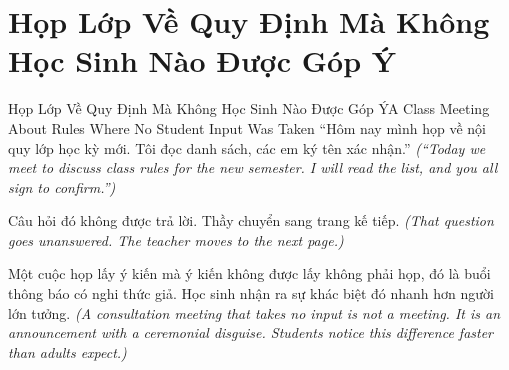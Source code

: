 \section{Họp Lớp Về Quy Định Mà Không Học Sinh Nào Được Góp Ý}
\begin{truyen}{Họp Lớp Về Quy Định Mà Không Học Sinh Nào Được Góp Ý}{A Class Meeting About Rules Where No Student Input Was Taken}
 ``Hôm nay mình họp về nội quy lớp học kỳ mới. Tôi đọc danh sách, các em ký tên xác nhận.''
\textit{(``Today we meet to discuss class rules for the new semester. I will read the list, and you all sign to confirm.'')}




Câu hỏi đó không được trả lời. Thầy chuyển sang trang kế tiếp.
\textit{(That question goes unanswered. The teacher moves to the next page.)}

\begin{baihoc}
Một cuộc họp lấy ý kiến mà ý kiến không được lấy không phải họp, đó là buổi thông báo có nghi thức giả. Học sinh nhận ra sự khác biệt đó nhanh hơn người lớn tưởng.
\textit{(A consultation meeting that takes no input is not a meeting. It is an announcement with a ceremonial disguise. Students notice this difference faster than adults expect.)}
\end{baihoc}
\end{truyen}

